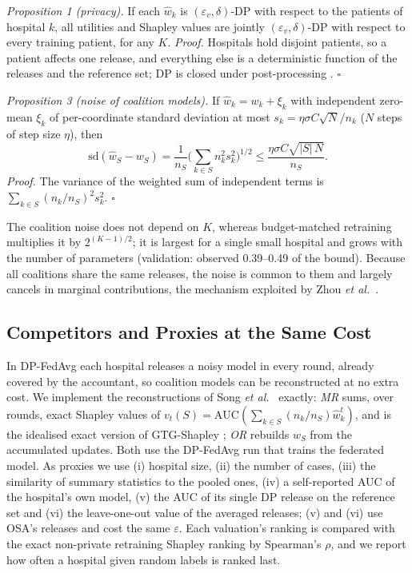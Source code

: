 \documentclass[journal]{IEEEtran}
\begin{document}
\emph{Proposition 1 (privacy).} If each $\hat w_k$ is $(\varepsilon_v,\delta)$-DP with respect to the patients of hospital $k$, all utilities and Shapley values are jointly $(\varepsilon_v,\delta)$-DP with respect to every training patient, for any $K$. \emph{Proof.} Hospitals hold disjoint patients, so a patient affects one release, and everything else is a deterministic function of the releases and the reference set; DP is closed under post-processing \cite{Dwork2008DPSurvey}. $\square$

\emph{Proposition 3 (noise of coalition models).} If $\hat w_k=w_k+\xi_k$ with independent zero-mean $\xi_k$ of per-coordinate standard deviation at most $s_k=\eta\sigma C\sqrt N/n_k$ ($N$ steps of step size $\eta$), then
\begin{equation}
\mathrm{sd}(\hat w_S - w_S) = \frac{1}{n_S}\Big(\sum_{k\in S} n_k^2 s_k^2\Big)^{1/2} \le \frac{\eta\sigma C\sqrt{|S|\,N}}{n_S}.
\label{eq:prop3}
\end{equation}
\emph{Proof.} The variance of the weighted sum of independent terms is $\sum_{k\in S}(n_k/n_S)^2s_k^2$. $\square$

The coalition noise does not depend on $K$, whereas budget-matched retraining multiplies it by $2^{(K-1)/2}$; it is largest for a single small hospital and grows with the number of parameters (validation: observed 0.39--0.49 of the bound). Because all coalitions share the same releases, the noise is common to them and largely cancels in marginal contributions, the mechanism exploited by Zhou \emph{et al.}\ \cite{Zhou2025Data}.

\subsection{Competitors and Proxies at the Same Cost}
In DP-FedAvg each hospital releases a noisy model in every round, already covered by the accountant, so coalition models can be reconstructed at no extra cost. We implement the reconstructions of Song \emph{et al.}\ \cite{Song2019BlockchainFL} exactly: \emph{MR} sums, over rounds, exact Shapley values of $v_t(S)=\mathrm{AUC}(\sum_{k\in S}(n_k/n_S)\hat w_k^t)$, and is the idealised exact version of GTG-Shapley \cite{Liu2022GTG}; \emph{OR} rebuilds $w_S$ from the accumulated updates. Both use the DP-FedAvg run that trains the federated model. As proxies we use (i) hospital size, (ii) the number of cases, (iii) the similarity of summary statistics to the pooled ones, (iv) a self-reported AUC of the hospital's own model, (v) the AUC of its single DP release on the reference set and (vi) the leave-one-out value of the averaged releases; (v) and (vi) use OSA's releases and cost the same $\varepsilon$. Each valuation's ranking is compared with the exact non-private retraining Shapley ranking by Spearman's $\rho$, and we report how often a hospital given random labels is ranked last.
\end{document}
